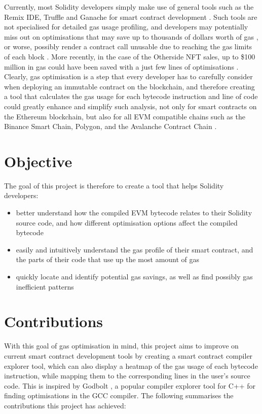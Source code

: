 Currently, most Solidity developers simply make use of general tools such as the Remix IDE, Truffle and Ganache for
smart contract development \cite{consensystools}. Such tools are not specialised for detailed gas usage profiling, and developers
may potentially miss out on optimisations that may save up to thousands of dollars worth of gas \cite{gaschecker},
or worse, possibly render a contract call unusable due to reaching the gas limits of each block \cite{governmentalstuck}.
More recently, in the case of the Otherside NFT sales, up to \$100 million in gas could have been saved with a just few lines of optimisations \cite{othersidenft}.
Clearly, gas optimisation is a step that every developer has to carefully consider when deploying an immutable contract on the blockchain,
and therefore creating a tool that calculates the gas usage for each bytecode instruction 
and line of code could greatly enhance and simplify such analysis, not only for 
smart contracts on the Ethereum blockchain, but also for all EVM compatible chains such as
the Binance Smart Chain, Polygon, and the Avalanche Contract Chain \cite{evmcompatiblechains}.

\section{Objective}

The goal of this project is therefore to create a tool that helps Solidity developers:

\begin{itemize}
  \item better understand how the compiled EVM bytecode relates to their Solidity source code,
  and how different optimisation options affect the compiled bytecode
  \item easily and intuitively understand the gas profile of their smart contract, and
  the parts of their code that use up the most amount of gas
  \item quickly locate and identify potential gas savings, as well as find possibly gas
  inefficient patterns
\end{itemize}

\section{Contributions}

With this goal of gas optimisation in mind, this project aims to improve on current 
smart contract development tools by creating a smart contract compiler explorer tool,
which can also display a heatmap of the gas usage of each bytecode instruction, while mapping
them to the corresponding lines in the user's source code. This is inspired by Godbolt \cite{godbolt},
a popular compiler explorer tool for C++ for finding optimisations in the GCC compiler.
The following summarises the contributions this project has achieved:

